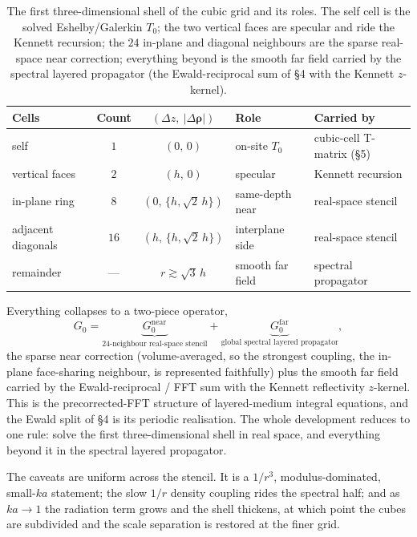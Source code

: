 \documentclass[11pt,a4paper]{article}
\newcommand{\brho}{\boldsymbol{\rho}}
\begin{document}
\begin{table}[h]
\centering
\renewcommand{\arraystretch}{1.3}
\begin{tabular}{@{}lccll@{}}
\toprule
Cells & Count & $(\Delta z,\ |\Delta\brho|)$ & Role & Carried by \\
\midrule
self & $1$ & $(0,\,0)$ & on-site $T_0$ & cubic-cell T-matrix (\S5) \\
vertical faces & $2$ & $(h,\,0)$ & specular & Kennett recursion \\
in-plane ring & $8$ & $(0,\,\{h,\sqrt2\,h\})$ & same-depth near & real-space stencil \\
adjacent diagonals & $16$ & $(h,\,\{h,\sqrt2\,h\})$ & interplane side & real-space stencil \\
remainder & --- & $r\gtrsim\sqrt3\,h$ & smooth far field & spectral propagator \\
\bottomrule
\end{tabular}
\caption{The first three-dimensional shell of the cubic grid and its roles. The self cell is
the solved Eshelby/Galerkin $T_0$; the two vertical faces are specular and ride the Kennett
recursion; the $24$ in-plane and diagonal neighbours are the sparse real-space near correction;
everything beyond is the smooth far field carried by the spectral layered propagator (the
Ewald-reciprocal sum of \S4 with the Kennett $z$-kernel).}
\label{tab:stencil}
\end{table}

Everything collapses to a two-piece operator,
\begin{equation}
\label{eq:twopiece}
G_0=\underbrace{G_0^{\text{near}}}_{\text{24-neighbour real-space stencil}}
+\underbrace{G_0^{\text{far}}}_{\text{global spectral layered propagator}},
\end{equation}
the sparse near correction (volume-averaged, so the strongest coupling, the in-plane
face-sharing neighbour, is represented faithfully) plus the smooth far field carried by the
Ewald-reciprocal / FFT sum with the Kennett reflectivity $z$-kernel. This is the
precorrected-FFT structure of layered-medium integral equations, and the Ewald split of \S4 is
its periodic realisation. The whole development reduces to one rule: solve the first
three-dimensional shell in real space, and everything beyond it in the spectral layered
propagator.

The caveats are uniform across the stencil. It is a $1/r^{3}$, modulus-dominated, small-$ka$
statement; the slow $1/r$ density coupling rides the spectral half; and as $ka\to1$ the
radiation term grows and the shell thickens, at which point the cubes are subdivided and the
scale separation is restored at the finer grid.
\end{document}
